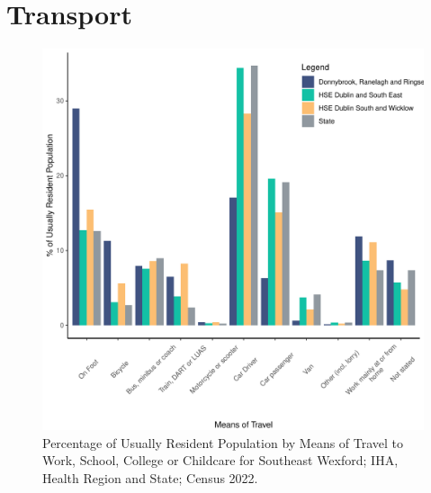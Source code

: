 \documentclass{article}
\begin{document}
\section{Transport}\label{sect:Trans}
\begin{figure}[H]
	\centering
	\includegraphics[width = 120mm]{../figures/TravelED.pdf}
	\caption{Percentage of Usually Resident Population by Means of Travel to Work, School, College or Childcare for Southeast Wexford; IHA, Health Region and State; Census 2022.}
	\label{fig:vbnv}
	\end{figure}
\end{document}

